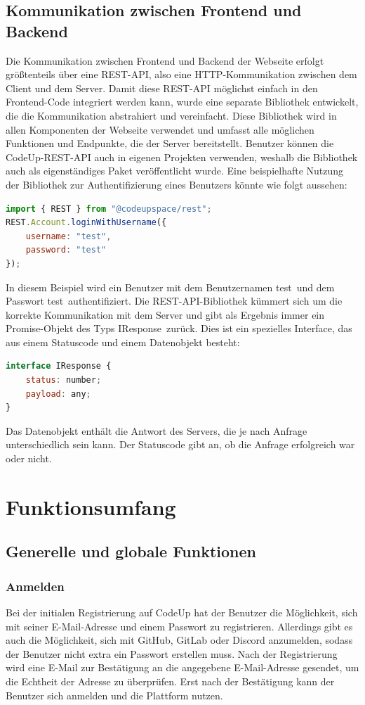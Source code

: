 \documentclass[main.tex]{subfiles}
\begin{document}
    \subsection{Kommunikation zwischen Frontend und Backend}\label{subsec:web_srv_communication}
    Die Kommunikation zwischen Frontend und Backend der Webseite erfolgt größtenteils über eine REST-API, also eine HTTP-Kommunikation zwischen dem Client und dem Server.
    Damit diese REST-API möglichst einfach in den Frontend-Code integriert werden kann, wurde eine separate Bibliothek entwickelt, die die Kommunikation abstrahiert und vereinfacht.
    Diese Bibliothek wird in allen Komponenten der Webseite verwendet und umfasst alle möglichen Funktionen und Endpunkte, die der Server bereitstellt.
    Benutzer können die CodeUp-REST-API auch in eigenen Projekten verwenden, weshalb die Bibliothek auch als eigenständiges Paket veröffentlicht wurde.
    Eine beispielhafte Nutzung der Bibliothek zur Authentifizierung eines Benutzers könnte wie folgt aussehen:
    \begin{lstlisting}[language=javascript]
import { REST } from "@codeupspace/rest";
REST.Account.loginWithUsername({
    username: "test",
    password: "test"
});
    \end{lstlisting}
    In diesem Beispiel wird ein Benutzer mit dem Benutzernamen \dq test\dq \ und dem Passwort \dq test\dq \ authentifiziert.
    Die REST-API-Bibliothek kümmert sich um die korrekte Kommunikation mit dem Server und gibt als Ergebnis immer ein Promise-Objekt des Typs \dq IResponse\dq\ zurück.
    Dies ist ein spezielles Interface, das aus einem Statuscode und einem Datenobjekt besteht:
    \begin{lstlisting}[language=javascript]
interface IResponse {
    status: number;
    payload: any;
}
    \end{lstlisting}
    Das Datenobjekt enthält die Antwort des Servers, die je nach Anfrage unterschiedlich sein kann.
    Der Statuscode gibt an, ob die Anfrage erfolgreich war oder nicht.

    \section{Funktionsumfang}
    \subsection{Generelle und globale Funktionen}
    \subsubsection{Anmelden}
    Bei der initialen Registrierung auf CodeUp hat der Benutzer die Möglichkeit, sich mit seiner E-Mail-Adresse und einem Passwort zu registrieren.
    Allerdings gibt es auch die Möglichkeit, sich mit GitHub, GitLab oder Discord anzumelden, sodass der Benutzer nicht extra ein Passwort erstellen muss.
    Nach der Registrierung wird eine E-Mail zur Bestätigung an die angegebene E-Mail-Adresse gesendet, um die Echtheit der Adresse zu überprüfen.
    Erst nach der Bestätigung kann der Benutzer sich anmelden und die Plattform nutzen.
\end{document}
